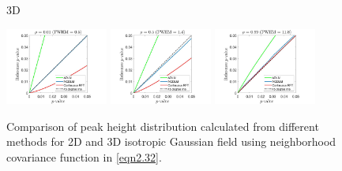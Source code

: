 \documentclass{article}
\begin{document}
\begin{figure}[!htp]
\begin{sideways}
\phantom{------------------}3D
\end{sideways}
\includegraphics[trim=80 5 80 5, clip,width=0.3\textwidth]{figure/3D_rho0.01.jpg}
\includegraphics[trim=80 5 80 5, clip,width=0.3\textwidth]{figure/3D_rho0.5.jpg}
\includegraphics[trim=80 5 80 5, clip,width=0.3\textwidth]{figure/3D_rho0.99.jpg}
\caption{Comparison of peak height distribution calculated from different methods for 2D and 3D isotropic Gaussian field using  neighborhood covariance function in \eqref{eqn2.32}.\label{fig9}}
\end{figure}
\end{document}
